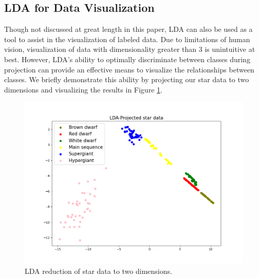 \documentclass[letterpaper, 10 pt, conference]{ieeeconf}  %
\begin{document}
\subsection{LDA for Data Visualization}
Though not discussed at great length in this paper, LDA can also be used as a tool to assist in the visualization of labeled data.
Due to limitations of human vision, visualization of data with dimensionality greater than 3 is unintuitive at best.
However, LDA's ability to optimally discriminate between classes during projection can provide an effective means to visualize the relationships between classes.
We briefly demonstrate this ability by projecting our star data to two dimensions and visualizing the results in Figure \ref{fig:starR2}.
\begin{figure}[h]
    \centering
    \includegraphics[width=\columnwidth]{figs/star_reduced.png}
    \caption{LDA reduction of star data to two dimensions.}
    \label{fig:starR2}
\end{figure}
\end{document}
